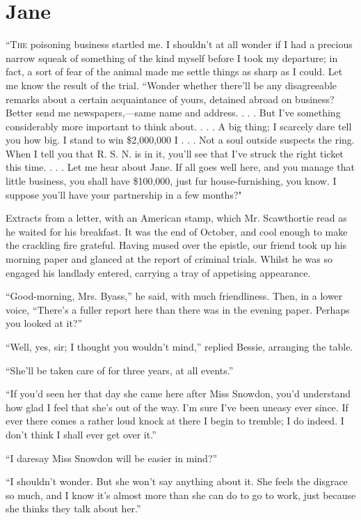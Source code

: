 \chapter{Jane}

\textsc{``The} poisoning business startled me. I shouldn't at all wonder
if I had a precious narrow squeak of something of the kind myself before
I took my departure; in fact, a sort of fear of the animal made me
settle things as sharp as I could. Let me know the result of the trial.
``Wonder whether there'll be any disagreeable remarks about a certain
acquaintance of yours, detained abroad on business? Better send me
newspapers,---same name and address. . . . But I've something
considerably more important to think about. . . . A big thing; I
scarcely dare tell you how big. I stand to win \$2,000,000 I . . . Not a
soul outside suspects the ring. When I tell you that R. S. N. is in it,
you'll see that I've struck the right ticket this time. . . . Let me
hear about Jane. If all goes well here, and you manage that little
business, you shall have \$100,000, just fur {} house-furnishing, you
know. I suppose you'll have your partnership in a few months?"

Extracts from a letter, with an American stamp, which Mr. Scawthortie
read as he waited for his breakfast. It was the end of October, and cool
enough to make the crackling fire grateful. Having mused over the
epistle, our friend took up his morning paper and glanced at the report
of criminal trials. Whilst he was so engaged his landlady entered,
carrying a tray of appetising appearance.

``Good-morning, Mrs. Byass,'' he said, with much friendliness. Then, in
a lower voice, ``There's a fuller report here than there was in the
evening paper. Perhaps you looked at it?''

``Well, yes, sir; I thought you wouldn't mind,'' replied Bessie,
arranging the table.

``She'll be taken care of for three years, at all events.''

``If you'd seen her that day she came here after Miss Snowdon, you'd
understand how glad I feel that she's out of the way. I'm sure I've been
uneasy ever since. If ever there comes a rather loud knock at there I
begin to tremble; I do indeed. I don't think I shall ever get over it.''

{} ``I daresay Miss Snowdon will be easier in mind?''

``I shouldn't wonder. But she won't say anything about it. She feels the
disgrace so much, and I know it's almost more than she can do to go to
work, just because she thinks they talk about her.''

